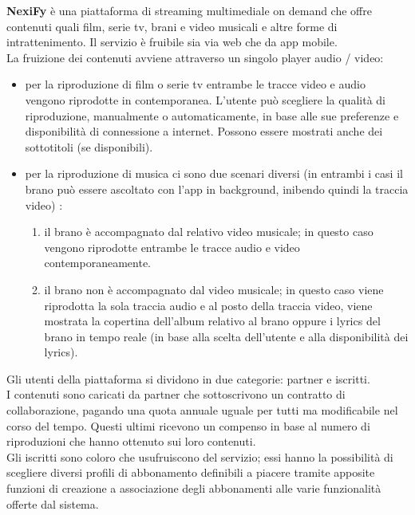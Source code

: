 \textbf{NexiFy} è una piattaforma di streaming multimediale on demand che offre contenuti quali film, serie tv, brani e video musicali e altre forme di intrattenimento. Il servizio è fruibile sia via web che da app mobile.\\

La fruizione dei contenuti avviene attraverso un singolo player audio / video:
\begin{itemize}\item per la riproduzione di film o serie tv entrambe le tracce video e audio vengono riprodotte in contemporanea. L’utente può scegliere la qualità di riproduzione, manualmente o automaticamente, in base alle sue preferenze e disponibilità di connessione a internet. Possono essere mostrati anche dei sottotitoli (se disponibili).
    \item per la riproduzione di musica ci sono due scenari diversi (in entrambi i casi il brano può essere ascoltato con l’app in background, inibendo quindi la traccia video) :
    \begin{enumerate}
        \item il brano è accompagnato dal relativo video musicale; in questo caso vengono riprodotte entrambe le tracce audio e video contemporaneamente.
        \item il brano non è accompagnato dal video musicale; in questo caso viene riprodotta la sola traccia audio e al posto della traccia video, viene mostrata la copertina dell’album relativo al brano oppure i lyrics del brano in tempo reale (in base alla scelta dell’utente e alla disponibilità dei lyrics).
    \end{enumerate}
\end{itemize}
    
Gli utenti della piattaforma si dividono in due categorie: partner e iscritti.\\

I contenuti sono caricati da partner che sottoscrivono un contratto di collaborazione, pagando una quota annuale uguale per tutti ma modificabile nel corso del tempo. Questi ultimi ricevono un compenso in base al numero di riproduzioni che hanno ottenuto sui loro contenuti.\\

Gli iscritti sono coloro che usufruiscono del servizio; essi hanno la possibilità di scegliere diversi profili di abbonamento definibili a piacere tramite apposite funzioni di creazione a associazione degli abbonamenti alle varie funzionalità offerte dal sistema.\\

